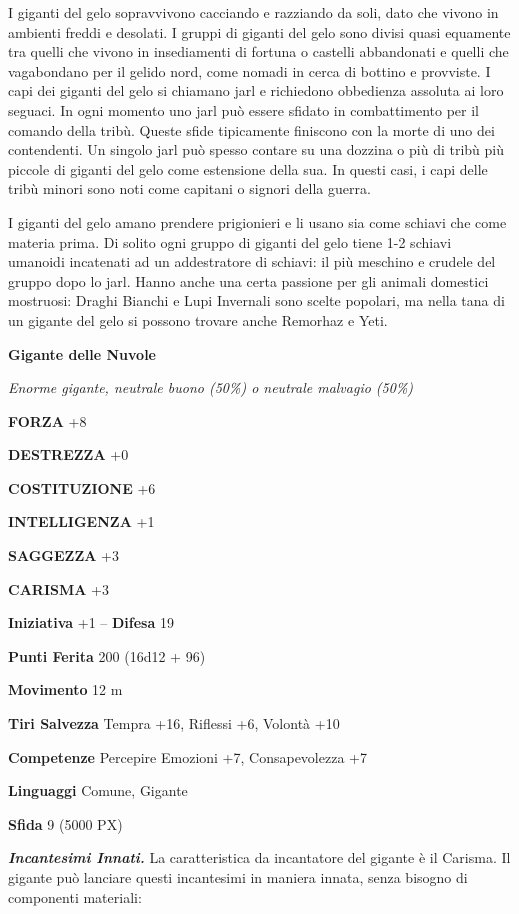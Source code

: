 \begin{multicols}{2}
I giganti del gelo sopravvivono cacciando e razziando da soli, dato che vivono in ambienti freddi e desolati. I gruppi di giganti del gelo sono divisi quasi equamente tra quelli che vivono in insediamenti di fortuna o castelli abbandonati e quelli che vagabondano per il gelido nord, come nomadi in cerca di bottino e provviste. I capi dei giganti del gelo si chiamano jarl e richiedono obbedienza assoluta ai loro seguaci. In ogni momento uno jarl può essere sfidato in combattimento per il comando della tribù. Queste sfide tipicamente finiscono con la morte di uno dei contendenti. Un singolo jarl può spesso contare su una dozzina o più di tribù più piccole di giganti del gelo come estensione della sua. In questi casi, i capi delle tribù minori sono noti come capitani o signori della guerra.

I giganti del gelo amano prendere prigionieri e li usano sia come schiavi che come materia prima. Di solito ogni gruppo di giganti del gelo tiene 1-2 schiavi umanoidi incatenati ad un addestratore di schiavi: il più meschino e crudele del gruppo dopo lo jarl. Hanno anche una certa passione per gli animali domestici mostruosi: Draghi Bianchi e Lupi Invernali sono scelte popolari, ma nella tana di un gigante del gelo si possono trovare anche Remorhaz e Yeti.

\medskip{}\textbf{Gigante delle Nuvole}

\textit{Enorme gigante, neutrale buono (50\%) o neutrale malvagio (50\%)}

\textbf{FORZA} +8

\textbf{DESTREZZA} +0

\textbf{COSTITUZIONE} +6

\textbf{INTELLIGENZA} +1

\textbf{SAGGEZZA} +3

\textbf{CARISMA} +3

\textbf{Iniziativa} +1 -- \textbf{Difesa} 19

\textbf{Punti Ferita} 200 (16d12 + 96)

\textbf{Movimento} 12 m

\textbf{Tiri Salvezza} Tempra +16, Riflessi +6, Volontà +10

\textbf{Competenze} Percepire Emozioni +7, Consapevolezza +7

\textbf{Linguaggi} Comune, Gigante

\textbf{Sfida} 9 (5000 PX)

\textit{\textbf{Incantesimi Innati.}} La caratteristica da incantatore del gigante è il Carisma. Il gigante può lanciare questi incantesimi in maniera innata, senza bisogno di componenti materiali:


\end{multicols}
